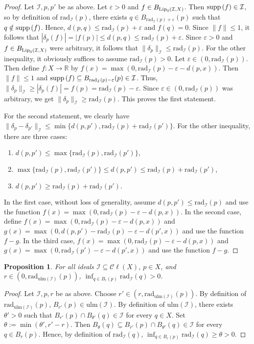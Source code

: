 \documentclass[12pt]{amsart}
\newtheorem{prop}[theorem]{Proposition}
\theoremstyle{definition}
\numberwithin{equation}{section}
\def \R {\mathbb{R}}
\def \I {\mathcal{I}}
\def \sbs {\subseteq}
\def \eps {\varepsilon}
\newcommand{\Cl}[1]{\mathcal{C}\ell\left(#1\right)}
\newcommand{\rad}[2]{\mathrm{rad}_{#1}\left(#2\right)}
\newcommand{\ulm}[1]{\mathrm{ulm}\left(#1\right)}
\begin{document}
\begin{proof}
Let $\I,p,p'$ be as above. Let $\eps > 0$ and $f \in B_{\Lip{\I}{X}}$. Then $\supp{f} \in \I$, so by definition of $\rad{\I}{p}$, there exists $q \in B_{\rad{\I}{p}+\eps}(p)$ such that $q \notin \supp{f}$. Hence, $d(p,q) \leq \rad{\I}{p}+\eps$ and $f(q) = 0$. Since $\|f\| \leq 1$, it follows that $|\delta_p(f)| = |f(p)| \leq d(p,q) \leq \rad{\I}{p}+\eps$. Since $\eps > 0$ and $f \in B_{\Lip{\I}{X}}$ were arbitrary, it follows that $\|\delta_p\|_\I \leq \rad{\I}{p}$. For the other inequality, it obviously suffices to assume $\rad{\I}{p} > 0$. Let $\eps \in (0,\rad{\I}{p})$. Then define $f: X \to \R$ by $f(x) = \max(0,\rad{\I}{p}-\eps-d(p,x))$. Then $\|f\| \leq 1$ and $\supp{f} \sbs B_{\rad{\I}{p}-\eps}(p) \in \I$. Thus, $\|\delta_p\|_\I \geq |\delta_p(f)| = f(p) = \rad{\I}{p}-\eps$. Since $\eps \in (0,\rad{\I}{p})$ was arbitrary, we get $\|\delta_p\|_\I \geq \rad{\I}{p}$. This proves the first statement.

For the second statement, we clearly have \\ $\|\delta_p-\delta_{p'}\|_\I \leq \min\{d(p,p'),\rad{\I}{p}+\rad{\I}{p'}\}$. For the other inequality, there are three cases:
\begin{enumerate}
\item $d(p,p') \leq \max\{\rad{\I}{p},\rad{\I}{p'}\}$,
\item $\max\{\rad{\I}{p},\rad{\I}{p'}\} \leq d(p,p') \leq \rad{\I}{p}+\rad{\I}{p'}$,
\item $d(p,p') \geq \rad{\I}{p}+\rad{\I}{p'}$.
\end{enumerate}
In the first case, without loss of generality, assume $d(p,p') \leq \rad{\I}{p}$ and use the function $f(x) = \max(0,\rad{\I}{p}-\eps-d(p,x))$. In the second case, define $f(x) = \max(0,\rad{\I}{p}-\eps-d(p,x))$ and $g(x) = \max(0,d(p,p')-\rad{\I}{p}-\eps-d(p',x))$ and use the function $f-g$. In the third case, $f(x) = \max(0,\rad{\I}{p}-\eps-d(p,x))$ and $g(x) = \max(0,\rad{\I}{p'}-\eps-d(p',x))$ and use the function $f-g$.
\end{proof}

\begin{prop} \label{prop:radIinf}
For all ideals $\I \sbs \Cl{X}$, $p \in X$, and \\ $r \in (0,\rad{\ulm{\I}}{p})$, $\inf_{q \in B_r(p)} \rad{\I}{q} > 0$.
\end{prop}

\begin{proof}
Let $\I,p,r$ be as above. Choose $r' \in (r,\rad{\ulm{\I}}{p})$. By definition of $\rad{\ulm{\I}}{p}$, $B_{r'}(p) \in \ulm{\I}$. By definition of $\ulm{\I}$, there exists $\theta' > 0$ such that $B_{r'}(p) \cap B_{\theta'}(q) \in \I$ for every $q \in X$. Set $\theta := \min(\theta',r'-r)$. Then $B_\theta(q) \sbs B_{r'}(p) \cap B_{\theta'}(q) \in \I$ for every $q \in B_r(p)$. Hence, by definition of $\rad{\I}{q}$, $\inf_{q \in B_r(p)} \rad{\I}{q} \geq \theta > 0$.
\end{proof}
\end{document}
